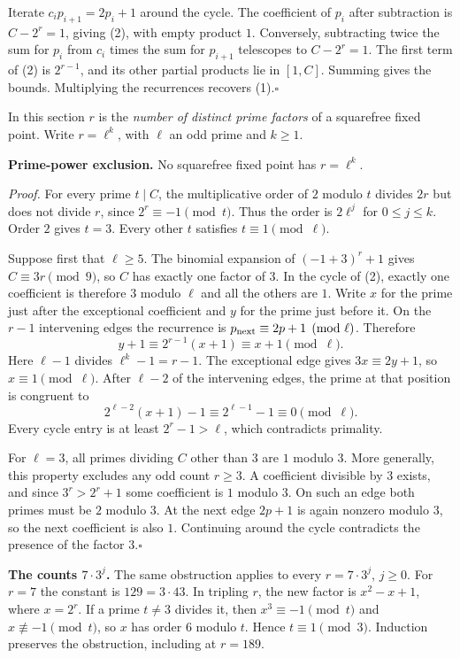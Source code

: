 \documentclass[12pt,letterpaper]{article}
\newcommand{\hd}[1]{\par\vspace{3pt}{\large\sffamily\bfseries\color{teal} #1}\par}
\newcommand{\thm}[1]{\textbf{\color{ink}#1.}\enspace}
\newcommand{\qedx}{\hfill\(\square\)}
\begin{document}
Iterate $c_i p_{i+1}=2p_i+1$ around the cycle. The coefficient of $p_i$ after subtraction is $C-2^r=1$, giving (2), with empty product $1$. Conversely, subtracting twice the sum for $p_i$ from $c_i$ times the sum for $p_{i+1}$ telescopes to $C-2^r=1$. The first term of (2) is $2^{r-1}$, and its other partial products lie in $[1,C]$. Summing gives the bounds. Multiplying the recurrences recovers (1).\qedx

\newpage
\hd{2\quad Excluding all odd prime-power counts}
In this section $r$ is the \emph{number of distinct prime factors} of a squarefree fixed point. Write $r=\ell^k$, with $\ell$ an odd prime and $k\ge1$.

\thm{Prime-power exclusion} No squarefree fixed point has $r=\ell^k$.

\emph{Proof.} For every prime $t\mid C$, the multiplicative order of $2$ modulo $t$ divides $2r$ but does not divide $r$, since $2^r\equiv-1\pmod t$. Thus the order is $2\ell^j$ for $0\le j\le k$. Order $2$ gives $t=3$. Every other $t$ satisfies $t\equiv1\pmod\ell$.

Suppose first that $\ell\ge5$. The binomial expansion of $(-1+3)^r+1$ gives $C\equiv3r\pmod9$, so $C$ has exactly one factor of $3$. In the cycle of (2), exactly one coefficient is therefore $3$ modulo $\ell$ and all the others are $1$. Write $x$ for the prime just after the exceptional coefficient and $y$ for the prime just before it. On the $r-1$ intervening edges the recurrence is $p_{\rm next}\equiv2p+1\pmod\ell$. Therefore
\[
y+1\equiv 2^{r-1}(x+1)\equiv x+1\pmod\ell.
\]
Here $\ell-1$ divides $\ell^k-1=r-1$. The exceptional edge gives $3x\equiv2y+1$, so $x\equiv1\pmod\ell$. After $\ell-2$ of the intervening edges, the prime at that position is congruent to
\[
2^{\ell-2}(x+1)-1\equiv2^{\ell-1}-1\equiv0\pmod\ell.
\]
Every cycle entry is at least $2^r-1>\ell$, which contradicts primality.

For $\ell=3$, all primes dividing $C$ other than $3$ are $1$ modulo $3$. More generally, this property excludes any odd count $r\ge3$. A coefficient divisible by $3$ exists, and since $3^r>2^r+1$ some coefficient is $1$ modulo $3$. On such an edge both primes must be $2$ modulo $3$. At the next edge $2p+1$ is again nonzero modulo $3$, so the next coefficient is also $1$. Continuing around the cycle contradicts the presence of the factor $3$.\qedx

\thm{The counts $7\cdot3^j$} The same obstruction applies to every $r=7\cdot3^j$, $j\ge0$. For $r=7$ the constant is $129=3\cdot43$. In tripling $r$, the new factor is $x^2-x+1$, where $x=2^r$. If a prime $t\ne3$ divides it, then $x^3\equiv-1\pmod t$ and $x\not\equiv-1\pmod t$, so $x$ has order $6$ modulo $t$. Hence $t\equiv1\pmod3$. Induction preserves the obstruction, including at $r=189$.
\end{document}
